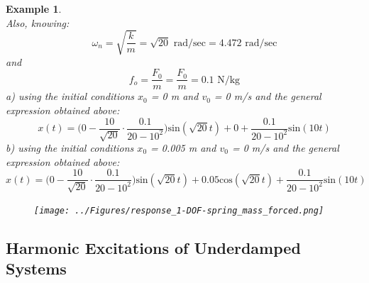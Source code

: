 \documentclass[12pt,letter]{article}
\newtheorem{ex}{Example}
\numberwithin{ex}{section} %
\newenvironment{example}{\begin{mdframed}[middlelinewidth=0.5mm]\begin{ex}\normalfont}{\end{ex}\end{mdframed}}
\numberwithin{re}{section} %
\begin{document}
\begin{example}
\begin{equation}
			\end{equation}								
			Also, knowing:
			\begin{equation}
				\omega_n = \sqrt{\frac{k}{m}} = \sqrt{20} \text{ rad/sec} =  4.472 \text{ rad/sec}
			\end{equation}				
			and
			\begin{equation}
				f_o = \frac{F_0}{m} = \frac{F_0}{m} = 0.1 \text{ N/kg}
			\end{equation}	
			a) using the initial conditions $x_0$ = 0 m and $v_0$ = 0 m/s and the general expression obtained above:
			\begin{equation}
				x(t) = \Big(0-\frac{10}{\sqrt{20}}\cdot \frac{0.1}{20-10^2}\Big)\text{sin}(\sqrt{20} t) + 0 + \frac{0.1}{20-10^2}\text{sin}(10 t)
			\end{equation}			
			b) using the initial conditions $x_0$ = 0.005 m and $v_0$ = 0 m/s and the general expression obtained above:
			\begin{equation}
				x(t) = \Big(0-\frac{10}{\sqrt{20}}\cdot \frac{0.1}{20-10^2}\Big)\text{sin}(\sqrt{20} t) + 0.05\text{cos}(\sqrt{20} t) + \frac{0.1}{20-10^2}\text{sin}(10 t)
			\end{equation}			
			\begin{figure}[H]
				\centering
				\texttt{[image: ../Figures/response\_1-DOF-spring\_mass\_forced.png]}
			\end{figure}
\end{example}


	
		\subsection{Harmonic Excitations of Underdamped Systems}
\end{document}
